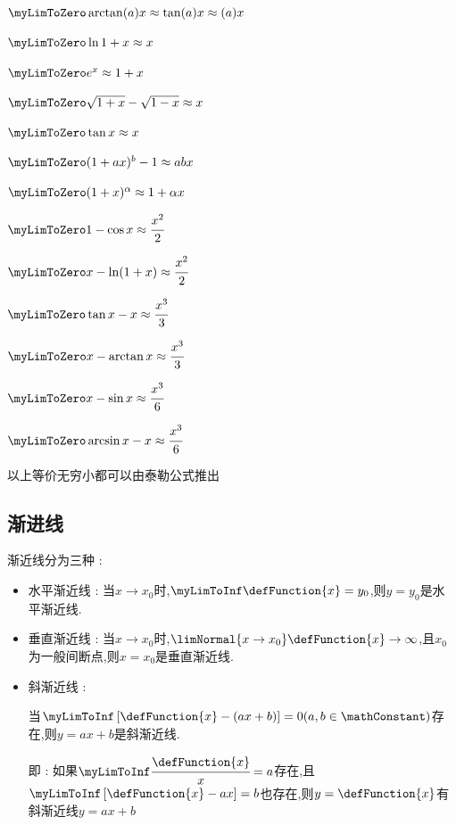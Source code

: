 {{{    $\myLimToZero \arctan(a)x \approx \tan(a)x \approx (a)x$

    $\myLimToZero \ln1+x \approx x$

    $\myLimToZero e^x \approx 1+x$

    $\myLimToZero \sqrt{1 + x} - \sqrt{1 - x} \approx x$

    $\myLimToZero \tan{x} \approx x$

    $\myLimToZero (1 + ax)^b - 1 \approx abx$

    $\myLimToZero (1+x)^\alpha \approx 1+\alpha x$

    $\myLimToZero 1 - \cos x \approx \cfrac{x^2}{2}$

    $\myLimToZero x - \ln(1 + x) \approx \cfrac{x^2}{2}$

    $\myLimToZero \tan x - x \approx \cfrac{x^3}{3}$

    $\myLimToZero x - \arctan x \approx \cfrac{x^3}{3}$

    $\myLimToZero x - \sin x \approx \cfrac{x^3}{6}$

    $\myLimToZero \arcsin x - x \approx \cfrac{x^3}{6}$

    以上等价无穷小都可以由泰勒公式推出
  }%

  \subsection{渐进线}{
    渐近线分为三种 :
    \begin{itemize}
      \item 水平渐近线 : 当$x \to x_0$时,$\myLimToInf\defFunction{x} = y_0$,则$y = y_0$是水平渐近线.
      \item 垂直渐近线 : 当$x \to x_0$时,$\limNormal{x \to x_0}\defFunction{x} \to \infty$,且$x_0$为一般间断点,则$x = x_0$是垂直渐近线.
      \item {
            斜渐近线 :

            当$\myLimToInf\left[\defFunction{x} - (ax + b)\right] = 0(a,b \in \mathConstant)$存在,则$y = ax + b$是斜渐近线.

            即 : 如果$\myLimToInf\cfrac{\defFunction{x}}{x} = a$存在,且$\myLimToInf\left[\defFunction{x} - ax\right] = b$也存在,则$y = \defFunction{x}$有斜渐近线$y = ax + b$
            }
    \end{itemize}
  }%


}}
